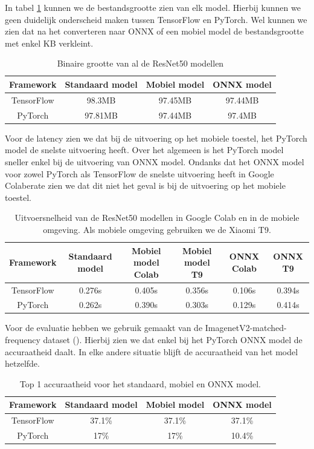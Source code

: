 In tabel \ref{tab:class_size} kunnen we de bestandsgrootte zien van elk model.
Hierbij kunnen we geen duidelijk onderscheid maken tussen TensorFlow en PyTorch.
Wel kunnen we zien dat na het converteren naar ONNX of een mobiel model de bestandsgrootte met enkel KB verkleint.
\begin{table}[!ht]
    \caption{Binaire grootte van al de ResNet50 modellen}
\begin{tabular}{cccc}
    \hline
    Framework & Standaard model & Mobiel model & ONNX model \\
    \hline
    TensorFlow & 98.3MB & 97.45MB & 97.44MB \\
    PyTorch & 97.81MB & 97.44MB & 97.4MB \\
    \hline
\end{tabular}
\label{tab:class_size}
\end{table}

Voor de latency zien we dat bij de uitvoering op het mobiele toestel, het PyTorch model de snelste uitvoering heeft.
Over het algemeen is het PyTorch model sneller enkel bij de uitvoering van ONNX model.
Ondanks dat het ONNX model voor zowel PyTorch als TensorFlow de snelste uitvoering heeft in Google Colaberate zien we dat dit niet het geval is bij de uitvoering op het mobiele toestel.

\begin{table}[!ht]
    \caption{Uitvoersnelheid van de ResNet50 modellen in Google Colab en in de mobiele omgeving. Als mobiele omgeving gebruiken we de Xiaomi T9.}
\begin{tabular}{cccccc}
    \hline
    Framework & Standaard model & Mobiel model Colab & Mobiel model T9 & ONNX Colab & ONNX T9\\
    \hline
    TensorFlow & 0.276s & 0.405s & 0.356s & 0.106s & 0.394s \\
    PyTorch & 0.262s & 0.390s & 0.303s & 0.129s & 0.414s \\
    \hline
\end{tabular}
\label{tab:class_speed}
\end{table}

Voor de evaluatie hebben we gebruik gemaakt van de ImagenetV2-matched-frequency dataset (\cite{recht2019imagenet}).
Hierbij zien we dat enkel bij het PyTorch ONNX model de accuraatheid daalt.
In elke andere situatie blijft de accuraatheid van het model hetzelfde.

\begin{table}[!ht]
    \caption{Top 1 accuraatheid voor het standaard, mobiel en ONNX model.}
\begin{tabular}{cccc}
    \hline
    Framework & Standaard model & Mobiel model & ONNX model \\
    \hline
    TensorFlow & 37.1\% & 37.1\% & 37.1\%  \\
    PyTorch & 17\% & 17\% & 10.4\%  \\
    \hline
\end{tabular}
\label{tab:class_acc}
\end{table}

